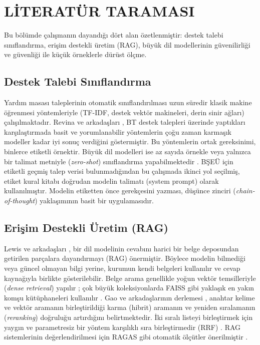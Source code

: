 \chapter{LİTERATÜR TARAMASI}
\label{ch:literatur}

Bu bölümde çalışmanın dayandığı dört alan özetlenmiştir: destek talebi sınıflandırma, erişim
destekli üretim (RAG), büyük dil modellerinin güvenilirliği ve güvenliği ile küçük örneklerle dürüst
ölçme.

\section{Destek Talebi Sınıflandırma}

Yardım masası taleplerinin otomatik sınıflandırılması uzun süredir klasik makine öğrenmesi
yöntemleriyle (TF-IDF, destek vektör makineleri, derin sinir ağları) çalışılmaktadır. Revina ve
arkadaşları \cite{revina2020}, BT destek talepleri üzerinde yaptıkları karşılaştırmada basit ve
yorumlanabilir yöntemlerin çoğu zaman karmaşık modeller kadar iyi sonuç verdiğini göstermiştir. Bu
yöntemlerin ortak gereksinimi, binlerce etiketli örnektir. Büyük dil modelleri ise az sayıda örnekle
veya yalnızca bir talimat metniyle (\textit{zero-shot}) sınıflandırma yapabilmektedir \cite{brown2020}.
BŞEÜ için etiketli geçmiş talep verisi bulunmadığından bu çalışmada ikinci yol seçilmiş, etiket kural
kitabı doğrudan modelin talimatı (system prompt) olarak kullanılmıştır. Modelin etiketten önce
gerekçesini yazması, düşünce zinciri (\textit{chain-of-thought}) yaklaşımının \cite{wei2022} basit bir
uygulamasıdır.

\section{Erişim Destekli Üretim (RAG)}

Lewis ve arkadaşları \cite{lewis2020}, bir dil modelinin cevabını harici bir belge deposundan
getirilen parçalara dayandırmayı (RAG) önermiştir. Böylece modelin bilmediği veya güncel olmayan
bilgi yerine, kurumun kendi belgeleri kullanılır ve cevap kaynağıyla birlikte gösterilebilir. Belge
arama genellikle yoğun vektör temsilleriyle (\textit{dense retrieval}) yapılır \cite{karpukhin2020};
çok büyük koleksiyonlarda FAISS gibi yaklaşık en yakın komşu kütüphaneleri kullanılır
\cite{johnson2019}. Gao ve arkadaşlarının derlemesi \cite{gao2023}, anahtar kelime ve vektör aramanın
birleştirildiği karma (hibrit) aramanın ve yeniden sıralamanın (\textit{reranking}) doğruluğu
artırdığını belirtmektedir. İki sıralı listeyi birleştirmek için yaygın ve parametresiz bir yöntem
karşılıklı sıra birleştirmedir (RRF) \cite{cormack2009}. RAG sistemlerinin değerlendirilmesi için
RAGAS gibi otomatik ölçütler önerilmiştir \cite{es2024}.

